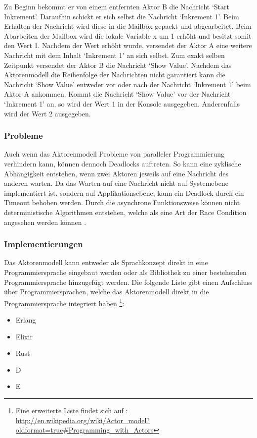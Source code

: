 Zu Beginn bekommt er von einem entfernten Aktor B die Nachricht `Start Inkrement'. Daraufhin schickt er sich selbst die Nachricht `Inkrement 1'. Beim Erhalten der Nachricht wird diese in die Mailbox gepackt und abgearbeitet. Beim Abarbeiten der Mailbox wird die lokale Variable x um 1 erhöht und besitzt somit den Wert 1. Nachdem der Wert erhöht wurde, versendet der Aktor A eine weitere Nachricht mit dem Inhalt `Inkrement 1' an sich selbst. Zum exakt selben Zeitpunkt versendet der Aktor B die Nachricht `Show Value'. Nachdem das Aktorenmodell  die Reihenfolge der Nachrichten nicht garantiert kann die Nachricht `Show Value' entweder vor oder nach der Nachricht `Inkrement 1' beim Aktor A ankommen. Kommt die Nachricht `Show Value' vor der Nachricht `Inkrement 1' an, so wird der Wert 1 in der Konsole ausgegeben. Anderenfalls wird der Wert 2 ausgegeben.

\subsubsection{Probleme}
Auch wenn das Aktorenmodell Probleme von paralleler Programmierung verhindern kann, können dennoch Deadlocks auftreten. So kann eine zyklische Abhängigkeit entstehen, wenn zwei Aktoren jeweils auf eine Nachricht des anderen warten. Da das Warten auf eine Nachricht nicht auf Systemebene implementiert ist, sondern auf Applikationsebene, kann ein Deadlock durch ein Timeout behoben werden. Durch die asynchrone Funktionsweise können nicht deterministische Algorithmen entstehen, welche als eine Art der Race Condition angesehen werden können \cite[p. 86]{Erb2012}. 

\subsubsection{Implementierungen}
Das Aktorenmodell kann entweder als Sprachkonzept direkt in eine Programmiersprache eingebaut werden oder als Bibliothek zu einer bestehenden Programmiersprache hinzugefügt werden. Die folgende Liste gibt einen Aufschluss über Programmiersprachen, welche das Aktorenmodell direkt in die Programmiersprache integriert haben \footnote{Eine erweiterte Liste findet sich auf  \cite[p. 86]{Erb2012}: \url{http://en.wikipedia.org/wiki/Actor_model?oldformat=true#Programming_with_Actors}}:

\begin{itemize}
  \item Erlang
  \item Elixir
  \item Rust
  \item D
  \item E
\end{itemize}

